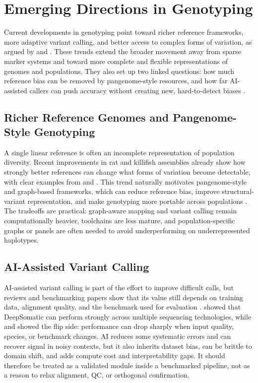 \documentclass{article}
\begin{document}
\section{Emerging Directions in Genotyping}
Current developments in genotyping point toward richer reference frameworks, more adaptive variant calling, and better access to complex forms of variation, as argued by \textcite{de2021towards} and \textcite{mahmoud2025hitchhiker}. These trends extend the broader movement away from sparse marker systems and toward more complete and flexible representations of genomes and populations. They also set up two linked questions: how much reference bias can be removed by pangenome-style resources, and how far AI-assisted callers can push accuracy without creating new, hard-to-detect biases \parencite{abdelwahab2025artificial}.

\subsection{Richer Reference Genomes and Pangenome-Style Genotyping}
A single linear reference is often an incomplete representation of population diversity. Recent improvements in rat and killifish assemblies already show how strongly better references can change what forms of variation become detectable, with clear examples from \textcite{de2024revamped} and \textcite{johnson2025genome}. This trend naturally motivates pangenome-style and graph-based frameworks, which can reduce reference bias, improve structural-variant representation, and make genotyping more portable across populations \parencite{morton2020challenges,de2021towards,mahmoud2025hitchhiker}. The tradeoffs are practical: graph-aware mapping and variant calling remain computationally heavier, toolchains are less mature, and population-specific graphs or panels are often needed to avoid underperforming on underrepresented haplotypes.

\subsection{AI-Assisted Variant Calling}
AI-assisted variant calling is part of the effort to improve difficult calls, but reviews and benchmarking papers show that its value still depends on training data, alignment quality, and the benchmark used for evaluation \parencite{abdelwahab2025artificial,majidian2023genomic}. \textcite{park2025accurate} showed that DeepSomatic can perform strongly across multiple sequencing technologies, while \textcite{guille2025benchmarking} and \textcite{choi2025learning} showed the flip side: performance can drop sharply when input quality, species, or benchmark changes. AI reduces some systematic errors and can recover signal in noisy contexts, but it also inherits dataset bias, can be brittle to domain shift, and adds compute cost and interpretability gaps. It should therefore be treated as a validated module inside a benchmarked pipeline, not as a reason to relax alignment, QC, or orthogonal confirmation.
\end{document}
